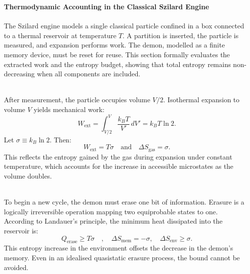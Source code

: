 \begin{technical}
{\Large\textbf{Thermodynamic Accounting in the Classical Szilard Engine}}\\[0.3em]

\\[0.5em]
The Szilard engine models a single classical particle confined in a box connected to a thermal reservoir at temperature \( T \). A partition is inserted, the particle is measured, and expansion performs work. The demon, modelled as a finite memory device, must be reset for reuse. This section formally evaluates the extracted work and the entropy budget, showing that total entropy remains non-decreasing when all components are included.

\vspace{0.5em}
\\[0.5em]
After measurement, the particle occupies volume \( V/2 \). Isothermal expansion to volume \( V \) yields mechanical work:
\[
W_{\text{ext}} = \int_{V/2}^{V} \frac{k_B T}{V'}\,dV' = k_B T \ln 2.
\]
Let \( \sigma \equiv k_B \ln 2 \). Then:
\[
W_{\text{ext}} = T \sigma
\quad \text{and} \quad
\Delta S_{\text{gas}} = \sigma.
\]
This reflects the entropy gained by the gas during expansion under constant temperature, which accounts for the increase in accessible microstates as the volume doubles.

\vspace{0.5em}
\\[0.5em]
To begin a new cycle, the demon must erase one bit of information. Erasure is a logically irreversible operation mapping two equiprobable states to one. According to Landauer's principle, the minimum heat dissipated into the reservoir is:
\[
Q_{\text{erase}} \geq T \sigma
\quad, \quad
\Delta S_{\text{mem}} = -\sigma, \quad
\Delta S_{\text{env}} \geq \sigma.
\]
This entropy increase in the environment offsets the decrease in the demon’s memory. Even in an idealised quasistatic erasure process, the bound cannot be avoided.


\end{technical}
